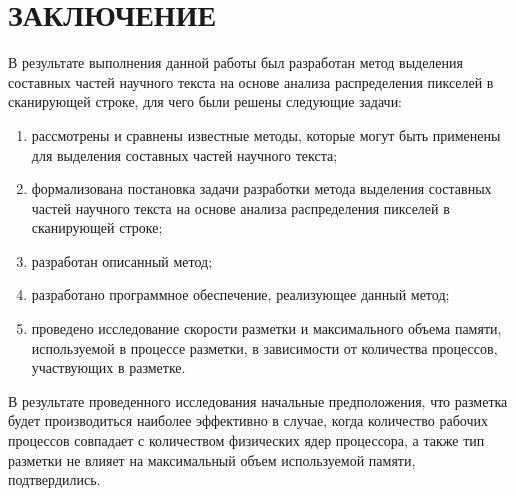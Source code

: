 \section*{ЗАКЛЮЧЕНИЕ}

В результате выполнения данной работы был разработан метод выделения составных частей научного текста на основе анализа распределения пикселей в сканирующей строке, для чего были решены следующие задачи:
\begin{enumerate}
    \item рассмотрены и сравнены известные методы, которые могут быть применены для выделения составных частей научного текста;
    \item формализована постановка задачи разработки метода выделения составных частей научного текста на основе анализа распределения пикселей в сканирующей строке;
    \item разработан описанный метод;
    \item разработано программное обеспечение, реализующее данный метод;
    \item проведено исследование скорости разметки и максимального объема памяти, используемой в процессе разметки, в зависимости от количества процессов, участвующих в разметке.
\end{enumerate}

В результате проведенного исследования начальные предположения, что разметка будет производиться наиболее эффективно в случае, когда количество рабочих процессов совпадает с количеством физических ядер процессора, а также тип разметки не влияет на максимальный объем используемой памяти, подтвердились.


%
